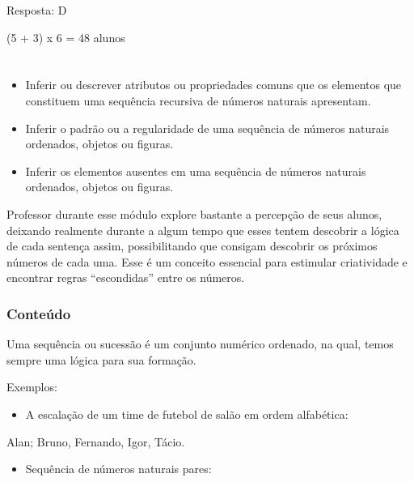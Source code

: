 \begin{escolha}
Resposta: D

(5 + 3) x 6 = 48 alunos

\chapter{}



\begin{itemize}
    \item Inferir ou descrever atributos ou propriedades comuns que os elementos
que constituem uma sequência recursiva de números naturais apresentam.

    \item Inferir o padrão ou a regularidade de uma sequência de números
naturais ordenados, objetos ou figuras.

    \item Inferir os elementos ausentes em uma sequência de números naturais
ordenados, objetos ou figuras.
\end{itemize}

Professor durante esse módulo explore bastante a percepção de seus
alunos, deixando realmente durante a algum tempo que esses tentem
descobrir a lógica de cada sentença assim, possibilitando que consigam
descobrir os próximos números de cada uma. Esse é um conceito essencial
para estimular criatividade e encontrar regras ``escondidas'' entre os
números.

\subsection{Conteúdo}\label{conteuxfado-2}

Uma sequência ou sucessão é um conjunto numérico ordenado, na qual,
temos sempre uma lógica para sua formação.

Exemplos:

\begin{itemize}
\item
  A escalação de um time de futebol de salão em ordem alfabética:
\end{itemize}

Alan; Bruno, Fernando, Igor, Tácio.

\begin{itemize}
\item
  Sequência de números naturais pares:
\end{itemize}


\end{escolha}
